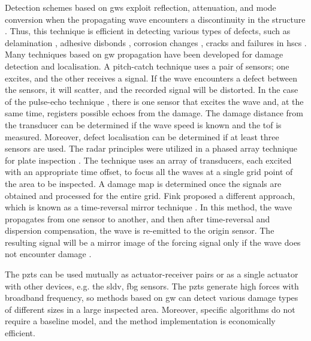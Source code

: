 \documentclass[11pt,a4paper,final]{report}
\theoremstyle{plain}
\begin{document}
Detection schemes based on \acp{gw} exploit reflection, attenuation, and mode conversion when the propagating wave encounters a discontinuity in the structure \cite{alleyne1992interaction}.
Thus, this technique is efficient in detecting various types of defects, such as delamination \cite{sohn2011delamination,tian2015delamination}, adhesive disbonds \cite{rucka2018damage,balasubramaniam2021ultrasonic}, corrosion changes \cite{alleyne1995long,lowe1998defect}, cracks \cite{tua2004detection,lu2006crack,zima2020detection} and failures in \acp{hsc} \cite{mustapha2011assessment, sikdar2016guided, sikdar2016ultrasonic,radzienski2016assessment, yu2019core}.
Many techniques based on \ac{gw} propagation have been developed for damage detection and localisation.
A pitch-catch technique \cite{ihn2008pitch, sikdar2017structural} uses a pair of sensors; one excites, and the other receives a signal.
If the wave encounters a defect between the sensors, it will scatter, and the recorded signal will be distorted.
In the case of the pulse-echo technique \cite{guo1993interaction, kudela2008damage}, there is one sensor that excites the wave and, at the same time, registers possible echoes from the damage.
The damage distance from the transducer can be determined if the wave speed is known and the \ac{tof} is measured.
Moreover, defect localisation can be determined if at least three sensors are used.
The radar principles were utilized in a phased array technique for plate inspection \cite{giurgiutiu2004embedded, ostachowicz2008elastic, kudela2018structural}.
The technique uses an array of transducers, each excited with an appropriate time offset, to focus all the waves at a single grid point of the area to be inspected.
A damage map is determined once the signals are obtained and processed for the entire grid.
Fink proposed a different approach, which is known as a time-reversal mirror technique \cite{fink1992time}.
In this method, the wave propagates from one sensor to another, and then after time-reversal and dispersion compensation, the wave is re-emitted to the origin sensor.
The resulting signal will be a mirror image of the forcing signal only if the wave does not encounter damage \cite{park2007time, eremin2016analytically}.

The \acp{pzt} can be used mutually as actuator-receiver pairs or as a single actuator with other devices, e.g. the \ac{sldv}, \ac{fbg} sensors.
The \acp{pzt} generate high forces with broadband frequency, so methods based on \ac{gw} can detect various damage types of different sizes in a large inspected area.
Moreover, specific algorithms do not require a baseline model, and the method implementation is economically efficient.
\end{document}
